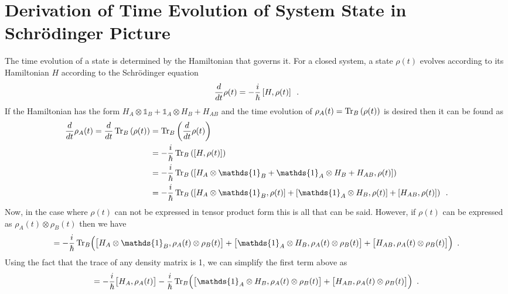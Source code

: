 \documentclass{article}
\begin{document}
\section{Derivation of Time Evolution of System State in Schr\"{o}dinger Picture}
\label{sec:derivation_of_time_evolution_of_system_state_in_schr"_o_dinger_picture}
The time evolution of a state is determined by the Hamiltonian that governs it.
For a closed system, a state $ \rho(t) $ evolves according to its Hamiltonian $
H $ according to the Schr\"{o}dinger equation
\[
   \frac{d}{dt} \rho(t) = - \frac{i}{\hbar} \left[ H, \rho(t) \right] \enskip.
\]
If the Hamiltonian has the form $ H_{A} \otimes \mathds{1}_{B} + \mathds{1}_{A}
\otimes H_{B} + H_{AB} $ and the time evolution of $ \rho_{A}(t) =
\operatorname{Tr}_{B}\left(\rho(t)\right) $ is desired then it can be found as
\begin{align}
   \frac{d}{dt} \rho_{A}(t) = \frac{d}{dt} \Tr_{B}\left(\rho(t)\right)
   &= \Tr_{B}\left( \frac{d}{dt} \rho(t) \right) \\
   &= -\frac{i}{\hbar} \Tr_{B} \left( \left[ H, \rho(t) \right] \right) \\
   &= -\frac{i}{\hbar} \Tr_{B} \left( \left[  H_{A} \otimes \mathds{1}_{B} + \mathds{1}_{A}
\otimes H_{B} + H_{AB} , \rho(t) \right]\right) \\
   &= -\frac{i}{\hbar} \Tr_{B} \left( \left[  H_{A} \otimes \mathds{1}_{B} ,
\rho(t) \right] + \left[ \mathds{1}_{A}
\otimes H_{B} , \rho(t) \right] + \left[ H_{AB} , \rho(t) \right]\right)
\enskip.
\end{align}
Now, in the case where $ \rho(t) $ can not be expressed in tensor
product form this is all that can be said. However, if $ \rho(t) $ can be
expressed as $ \rho_{A}(t) \otimes \rho_{B}(t) $ then we have
\begin{equation}
= -\frac{i}{\hbar} \Tr_{B} \Bigl( \bigl[  H_{A} \otimes \mathds{1}_{B} ,
 \rho_{A}(t) \otimes \rho_{B}(t)  \bigr]
 + \bigl[ \mathds{1}_{A} \otimes H_{B} , \rho_{A}(t) \otimes \rho_{B}(t)
 \bigr]
+ \bigl[ H_{AB} ,  \rho_{A}(t) \otimes \rho_{B}(t) \bigr] \Bigr) \enskip.
\end{equation}
Using the fact that the trace of any density matrix is 1, we can simplify the
first term above as
\begin{equation}
= -\frac{i}{\hbar} \bigl[  H_{A} , \rho_{A}(t) \bigr]
 -\frac{i}{\hbar} \Tr_{B} \Bigl( \bigl[ \mathds{1}_{A} \otimes H_{B} , \rho_{A}(t) \otimes \rho_{B}(t)
 \bigr]
+ \bigl[ H_{AB} ,  \rho_{A}(t) \otimes \rho_{B}(t) \bigr] \Bigr) \enskip.
\end{equation}
\end{document}
